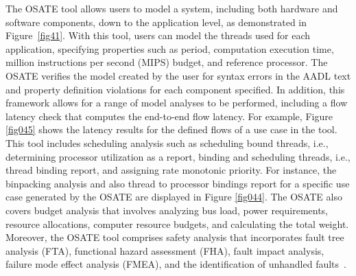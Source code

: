 The OSATE tool allows users to model a system, including both hardware and software components, down to the application level, as demonstrated in Figure~\ref{fig41}. With this tool, users can model the threads used for each application, specifying properties such as period, computation execution time, million instructions per second (MIPS) budget, and reference processor.
The OSATE verifies the model created by the user for syntax errors in the AADL text and property definition violations for each component specified.
In addition, this framework allows for a range of model analyses to be performed, including a flow latency check that computes the end-to-end flow latency. For example, Figure \ref{fig045} shows the latency results for the defined flows of a use case in the tool. 
This tool includes scheduling analysis such as scheduling bound threads, i.e., determining processor utilization as a report, binding and scheduling threads, i.e., thread binding report, and assigning rate monotonic priority. For instance, the binpacking analysis and also thread to processor bindings report for a specific use case generated by the OSATE are displayed in Figure \ref{fig044}. The OSATE also covers budget analysis that involves analyzing bus load, power requirements, resource allocations, computer resource budgets, and calculating the total weight. Moreover, the OSATE tool comprises safety analysis that incorporates fault tree analysis (FTA), functional hazard assessment (FHA), fault impact analysis, failure mode effect analysis (FMEA), and the identification of unhandled faults~\cite{osate,askaripoor2022architecture}.
